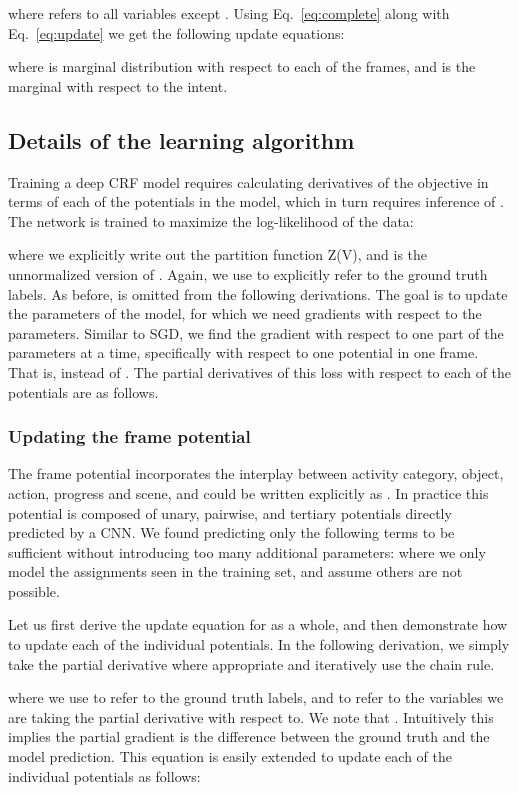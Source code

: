 \documentclass[10pt,twocolumn,letterpaper]{article}
\begin{document}
where  refers to all variables except . Using Eq.~\ref{eq:complete} along with Eq.~\ref{eq:update} we get the following update equations:

where  is marginal distribution with respect to each of the frames, and  is the marginal with respect to the intent.

\subsection{Details of the learning algorithm}

Training a deep CRF model requires calculating derivatives of the objective in terms of each of the potentials in the model, which in turn requires inference of . The network is trained to maximize the log-likelihood of the data:

where we explicitly write out the partition function Z(V), and  is the unnormalized version of . Again, we use  to explicitly refer to the ground truth labels. As before,  is omitted from the following derivations.
The goal is to update the parameters of the model, for which we need gradients with respect to the parameters. Similar to SGD, we find the gradient with respect to one part of the parameters at a time, specifically with respect to one potential in one frame. That is,  instead of .
The partial derivatives of this loss with respect to each of the potentials are as follows.

\subsubsection{Updating the frame potential }

The frame potential  incorporates the interplay between activity category, object, action, progress and scene, and could be written explicitly as . In practice this potential is composed of unary, pairwise, and tertiary potentials directly predicted by a CNN. We found predicting only the following terms to be sufficient without introducing too many additional parameters:
 where we only model the assignments seen in the training set, and assume others are not possible.

Let us first derive the update equation for  as a whole, and then demonstrate how to update each of the individual potentials. In the following derivation, we simply take the partial derivative where appropriate and iteratively use the chain rule.


where we use  to refer to the ground truth labels, and  to refer to the variables we are taking the partial derivative with respect to. We note that . Intuitively this implies the partial gradient is the difference between the ground truth and the model prediction.
This equation is easily extended to update each of the individual potentials as follows:
\end{document}
